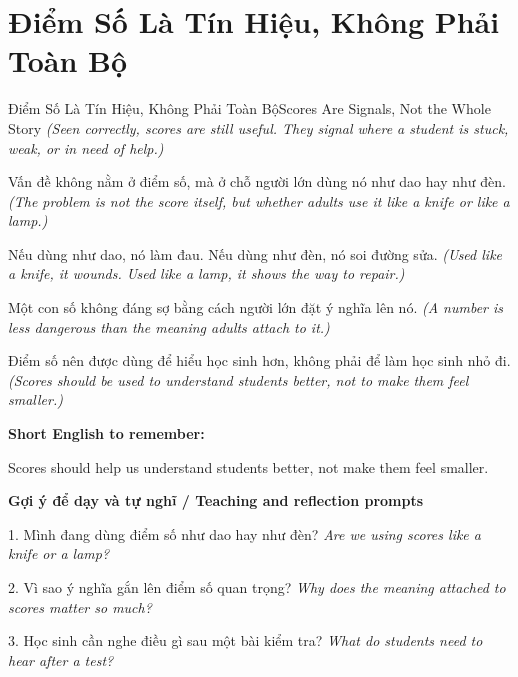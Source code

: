 \section{Điểm Số Là Tín Hiệu, Không Phải Toàn Bộ}
\begin{truyen}{Điểm Số Là Tín Hiệu, Không Phải Toàn Bộ}{Scores Are Signals, Not the Whole Story}
\textit{(Seen correctly, scores are still useful. They signal where a student is stuck, weak, or in need of help.)}

Vấn đề không nằm ở điểm số, mà ở chỗ người lớn dùng nó như dao hay như đèn.
\textit{(The problem is not the score itself, but whether adults use it like a knife or like a lamp.)}

Nếu dùng như dao, nó làm đau. Nếu dùng như đèn, nó soi đường sửa.
\textit{(Used like a knife, it wounds. Used like a lamp, it shows the way to repair.)}

Một con số không đáng sợ bằng cách người lớn đặt ý nghĩa lên nó.
\textit{(A number is less dangerous than the meaning adults attach to it.)}

\end{truyen}

\begin{baihoc}
Điểm số nên được dùng để hiểu học sinh hơn, không phải để làm học sinh nhỏ đi.
\textit{(Scores should be used to understand students better, not to make them feel smaller.)}
\end{baihoc}

\begin{ghinhoanh}
\textbf{Short English to remember:}

Scores should help us understand students better, not make them feel smaller.

\end{ghinhoanh}

\begin{tuhocnhanh}
\textbf{Gợi ý để dạy và tự nghĩ / Teaching and reflection prompts}

1. Mình đang dùng điểm số như dao hay như đèn? \textit{Are we using scores like a knife or a lamp?}

2. Vì sao ý nghĩa gắn lên điểm số quan trọng? \textit{Why does the meaning attached to scores matter so much?}

3. Học sinh cần nghe điều gì sau một bài kiểm tra? \textit{What do students need to hear after a test?}
\end{tuhocnhanh}
\ngancach

